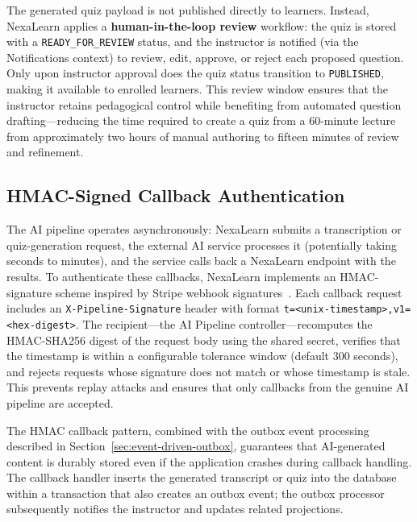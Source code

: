 The generated quiz payload is not published directly to learners. Instead, NexaLearn applies a \textbf{human-in-the-loop review} workflow: the quiz is stored with a \texttt{READY\_FOR\_REVIEW} status, and the instructor is notified (via the Notifications context) to review, edit, approve, or reject each proposed question. Only upon instructor approval does the quiz status transition to \texttt{PUBLISHED}, making it available to enrolled learners. This review window ensures that the instructor retains pedagogical control while benefiting from automated question drafting---reducing the time required to create a quiz from a 60-minute lecture from approximately two hours of manual authoring to fifteen minutes of review and refinement.

\subsection{HMAC-Signed Callback Authentication}

The AI pipeline operates asynchronously: NexaLearn submits a transcription or quiz-generation request, the external AI service processes it (potentially taking seconds to minutes), and the service calls back a NexaLearn endpoint with the results. To authenticate these callbacks, NexaLearn implements an HMAC-signature scheme inspired by Stripe webhook signatures~\cite{stripe2024api}. Each callback request includes an \texttt{X-Pipeline-Signature} header with format \texttt{t=<unix-timestamp>,v1=<hex-digest>}. The recipient---the AI Pipeline controller---recomputes the HMAC-SHA256 digest of the request body using the shared secret, verifies that the timestamp is within a configurable tolerance window (default 300 seconds), and rejects requests whose signature does not match or whose timestamp is stale. This prevents replay attacks and ensures that only callbacks from the genuine AI pipeline are accepted.

The HMAC callback pattern, combined with the outbox event processing described in Section~\ref{sec:event-driven-outbox}, guarantees that AI-generated content is durably stored even if the application crashes during callback handling. The callback handler inserts the generated transcript or quiz into the database within a transaction that also creates an outbox event; the outbox processor subsequently notifies the instructor and updates related projections.

